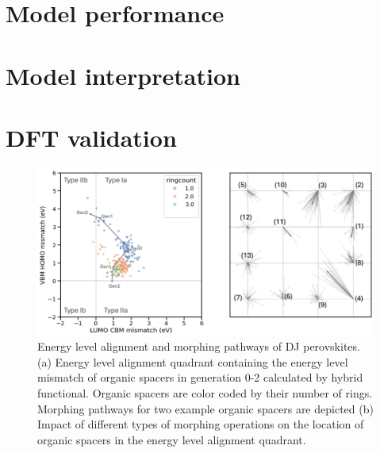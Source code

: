 \section{Model performance}

\section{Model interpretation}

\section{DFT validation}

\begin{figure}[!ht]
\centering
\includegraphics[width=\textwidth]{figures/machine-learning/machine-learning-1.png}
\caption[Energy level alignment and morphing pathways of DJ perovskites.]{Energy level alignment and morphing pathways of DJ perovskites. (a) Energy level alignment quadrant containing the energy level mismatch of organic spacers in generation 0-2 calculated by hybrid functional. Organic spacers are color coded by their number of rings. Morphing pathways for two example organic spacers are depicted (b) Impact of different types of morphing operations on the location of organic spacers in the energy level alignment quadrant.}
\label{f:machinelearning1}
\end{figure}

